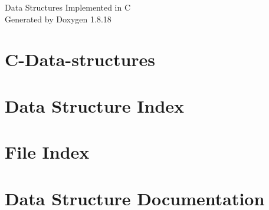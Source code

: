 \let\mypdfximage\pdfximage\def\pdfximage{\immediate\mypdfximage}\documentclass[twoside]{book}
\newcommand{\+}{\discretionary{\mbox{\scriptsize$\hookleftarrow$}}{}{}}
\newcommand{\clearemptydoublepage}{%
  \newpage{\pagestyle{empty}\cleardoublepage}%
}
\begin{document}
\hypersetup{pageanchor=false,
             bookmarksnumbered=true,
             pdfencoding=unicode
            }
\begin{titlepage}
\vspace*{7cm}
\begin{center}%
{\Large Data Structures Implemented in C }\\
\vspace*{1cm}
{\large Generated by Doxygen 1.8.18}\\
\end{center}
\end{titlepage}
\clearemptydoublepage
{}
\tableofcontents
\clearemptydoublepage
{}
\hypersetup{pageanchor=true}

\chapter{C-\/\+Data-\/structures}
\label{md__r_e_a_d_m_e}

\chapter{Data Structure Index}

\chapter{File Index}

\chapter{Data Structure Documentation}

























\end{document}

